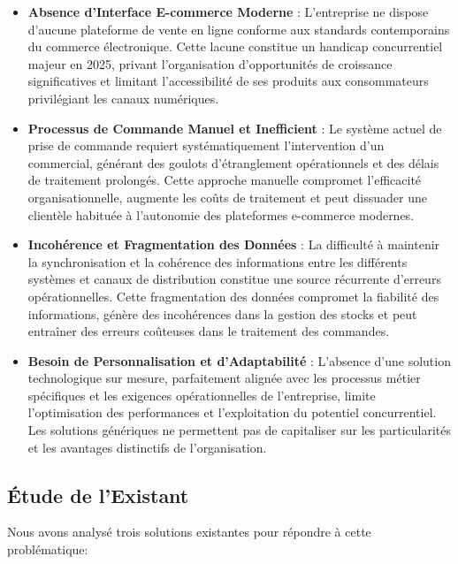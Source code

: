 \documentclass[12pt,a4paper]{report}
\begin{document}
\begin{itemize}
   \item \textbf{Absence d'Interface E-commerce Moderne} : L'entreprise ne dispose d'aucune plateforme de vente en ligne conforme aux standards contemporains du commerce électronique. Cette lacune constitue un handicap concurrentiel majeur en 2025, privant l'organisation d'opportunités de croissance significatives et limitant l'accessibilité de ses produits aux consommateurs privilégiant les canaux numériques.
    
    \item \textbf{Processus de Commande Manuel et Inefficient} : Le système actuel de prise de commande requiert systématiquement l'intervention d'un commercial, générant des goulots d'étranglement opérationnels et des délais de traitement prolongés. Cette approche manuelle compromet l'efficacité organisationnelle, augmente les coûts de traitement et peut dissuader une clientèle habituée à l'autonomie des plateformes e-commerce modernes.
    
    \item \textbf{Incohérence et Fragmentation des Données} : La difficulté à maintenir la synchronisation et la cohérence des informations entre les différents systèmes et canaux de distribution constitue une source récurrente d'erreurs opérationnelles. Cette fragmentation des données compromet la fiabilité des informations, génère des incohérences dans la gestion des stocks et peut entraîner des erreurs coûteuses dans le traitement des commandes.
    
    \item \textbf{Besoin de Personnalisation et d'Adaptabilité} : L'absence d'une solution technologique sur mesure, parfaitement alignée avec les processus métier spécifiques et les exigences opérationnelles de l'entreprise, limite l'optimisation des performances et l'exploitation du potentiel concurrentiel. Les solutions génériques ne permettent pas de capitaliser sur les particularités et les avantages distinctifs de l'organisation.
\end{itemize}

\subsection{Étude de l'Existant}
Nous avons analysé trois solutions existantes pour répondre à cette problématique:
\end{document}
